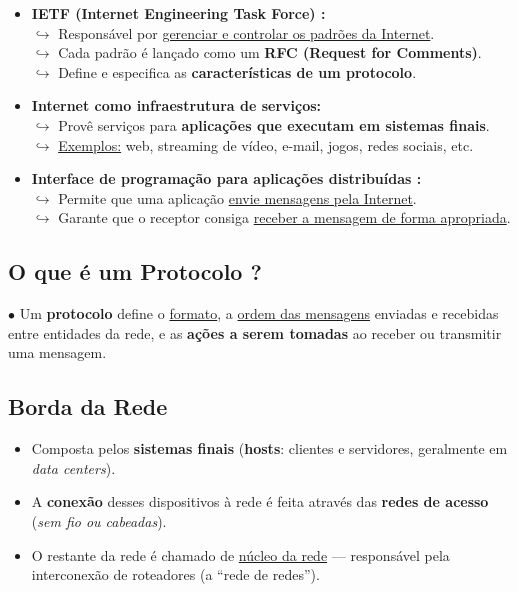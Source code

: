\begin{itemize}
        \item \textbf{IETF (Internet Engineering Task Force) :}  \\
            $\hookrightarrow$ Responsável por \underline{gerenciar e controlar os padrões da Internet}. \\  
            $\hookrightarrow$ Cada padrão é lançado como um \textbf{RFC (Request for Comments)}. \\ 
            $\hookrightarrow$ Define e especifica as \textbf{características de um protocolo}. 
        
        \item \textbf{Internet como infraestrutura de serviços:}  \\
            $\hookrightarrow$ Provê serviços para \textbf{aplicações que executam em sistemas finais}. \\  
            $\hookrightarrow$ \underline{Exemplos:} web, streaming de vídeo, e-mail, jogos, redes sociais, etc. 
        
        \item \textbf{Interface de programação para aplicações distribuídas :} \\ 
            $\hookrightarrow$ Permite que uma aplicação \underline{envie mensagens pela Internet}. \\  
            $\hookrightarrow$ Garante que o receptor consiga \underline{receber a mensagem de forma apropriada}.

    \end{itemize}

    \subsection{O que é um Protocolo ?}

        $\bullet$ Um \textbf{protocolo} define o \underline{formato}, a \underline{ordem das mensagens} enviadas e recebidas entre entidades da rede, e as \textbf{ações a serem tomadas} ao receber ou transmitir uma mensagem.

    \subsection{Borda da Rede}

    \begin{itemize}
        \item Composta pelos \textbf{sistemas finais} (\textbf{hosts}: clientes e servidores, geralmente em \textit{data centers}).
        \item A \textbf{conexão} desses dispositivos à rede é feita através das \textbf{redes de acesso} (\textit{sem fio ou cabeadas}).
        \item O restante da rede é chamado de \underline{núcleo da rede} — responsável pela interconexão de roteadores (a “rede de redes”).
    \end{itemize}


